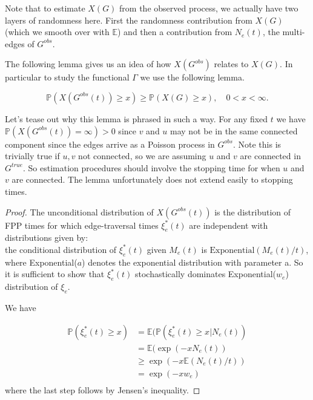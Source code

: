 Note that to estimate $X(G)$ from the observed process, we actually have two layers of randomness here.  First the randomness contribution from $X(G)$ (which we smooth over with $\mathbb{E}$) and then a contribution from $N_e(t)$, the multi-edges of $G^{obs}$.  

The following lemma gives us an idea of how $X(G^{obs})$ relates to $X(G)$.
In particular to study the functional $\Gamma$ we use the following lemma. 

\begin{lemma}
$$\mathbb{P}(X(G^{obs}(t)) \geq x) \geq \mathbb{P}(X(G) \geq x),\quad 0 < x<\infty .$$
\end{lemma}

Let's tease out why this lemma is phrased in such a way.  For any fixed $t$ we have $\mathbb{P}(X(G^{obs}(t)) = \infty) > 0$ since $v$ and $u$ may not be in the same connected component since the edges arrive as a Poisson process in $G^{obs}$.  Note this is trivially true if $u,v$ not connected, so we are assuming $u$ and $v$ are connected in $G^{true}$.  So estimation procedures should involve the stopping time for when $u$ and $v$ are connected.  The lemma unfortunately does not extend easily to stopping times.  

\begin{proof}
The unconditional distribution of $X(G^{obs}(t))$ is the distribution of FPP times for which edge-traversal times $\xi_e^*(t)$ are independent with distributions given by:\\
the conditional distribution of $\xi_e^*(t)$ given $M_e(t)$ is $ \text{Exponential}(M_e(t)/t)$, where Exponential($a$) denotes the exponential distribution with parameter a. So it is sufficient to show that $\xi^*_e(t)$ stochastically dominates Exponential($w_e$) distribution of $\xi_e$.  

We have

\begin{equation}
\begin{split}
\mathbb{P}(\xi_e^*(t) \geq x) &= \mathbb{E}(\mathbb{P}(\xi_e^*(t) \geq x |N_e(t))\\
&= \mathbb{E}(\exp(-x N_e(t)) \\
&\geq \exp(-x \mathbb{E}(N_e(t)/t))\\
&=\exp(-x w_e)\\
\end{split}
\end{equation}
where the last step follows by Jensen's inequality. 
\end{proof}

